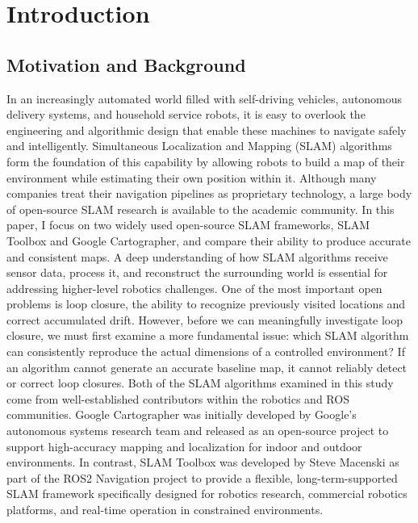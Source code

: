 \documentclass[runningheads,11pt]{llncs_bigfont_absbib}
\begin{document}
\section{Introduction}
\subsection{Motivation and Background}
In an increasingly automated world filled with self-driving vehicles, autonomous delivery systems, and household service robots, it is easy to overlook the engineering and algorithmic design that enable these machines to navigate safely and intelligently. Simultaneous Localization and Mapping (SLAM) algorithms form the foundation of this capability by allowing robots to build a map of their environment while estimating their own position within it. Although many companies treat their navigation pipelines as proprietary technology, a large body of open-source SLAM research is available to the academic community. In this paper, I focus on two widely used open-source SLAM frameworks, SLAM Toolbox and Google Cartographer, and compare their ability to produce accurate and consistent maps.
A deep understanding of how SLAM algorithms receive sensor data, process it, and reconstruct the surrounding world is essential for addressing higher-level robotics challenges. One of the most important open problems is loop closure, the ability to recognize previously visited locations and correct accumulated drift. However, before we can meaningfully investigate loop closure, we must first examine a more fundamental issue: which SLAM algorithm can consistently reproduce the actual dimensions of a controlled environment? If an algorithm cannot generate an accurate baseline map, it cannot reliably detect or correct loop closures.
Both of the SLAM algorithms examined in this study come from well-established contributors within the robotics and ROS communities. Google Cartographer was initially developed by Google’s autonomous systems research team and released as an open-source project to support high-accuracy mapping and localization for indoor and outdoor environments. In contrast, SLAM Toolbox was developed by Steve Macenski as part of the ROS2 Navigation project to provide a flexible, long-term-supported SLAM framework specifically designed for robotics research, commercial robotics platforms, and real-time operation in constrained environments.
\end{document}
